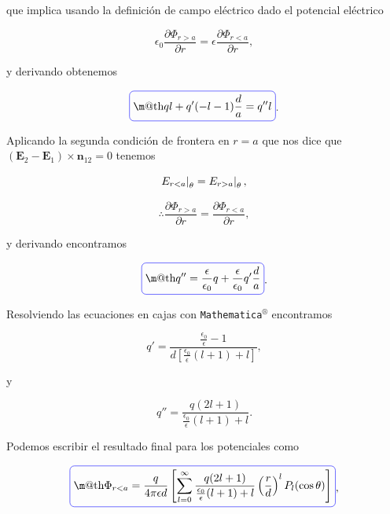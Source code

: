 \documentclass[a4paper,11pt]{article}
\makeatletter
\numberwithin{equation}{section}
\newcommand{\zerodel}{.\kern-\nulldelimiterspace}
\newcommand*{\boxcolor}{blue}
\renewcommand{\boxed}[1]{\textcolor{\boxcolor}{%
\tikz[baseline={([yshift=-1ex]current bounding box.center)}] \node [rectangle, minimum width=1ex,rounded corners,draw] {\normalcolor\m@th$\displaystyle#1$};}}
\makeatother
\begin{document}
que implica usando la definición de campo eléctrico dado el potencial eléctrico 

\begin{equation}
 \epsilon_0 \frac{\partial \Phi_{r > a}}{\partial r} = \epsilon 
 \frac{\partial \Phi_{r < a}}{\partial r},
\end{equation}

y derivando obtenemos 

\begin{equation}
 \boxed{ql + q'(-l -1)\frac{d}{a} = q'' l}.
\end{equation}

Aplicando la segunda condición de frontera en $r = a$ que nos dice que 
$(\mathbf{E}_2 - \mathbf{E}_1) \times \mathbf{n}_{12} = 0$ tenemos 

\begin{equation}
 \left\zerodel E_{r < a}\right|_\theta = \left\zerodel E_{r > a}\right|_\theta,
\end{equation}

\begin{equation}
 \therefore \frac{\partial \Phi_{r > a}}{\partial r} = 
 \frac{\partial \Phi_{r < a}}{\partial r},
\end{equation}

y derivando encontramos 

\begin{equation}
 \boxed{q'' = \frac{\epsilon}{\epsilon_0}q + \frac{\epsilon}{\epsilon_0}q'\frac{d}{a}}.
\end{equation}

Resolviendo las ecuaciones en cajas con \texttt{Mathematica$^\circledR$} encontramos 

\begin{equation}
 q' = \frac{\frac{\epsilon_0}{\epsilon} - 1}{d\left[\frac{\epsilon_0}{\epsilon}(l+1) + l\right]},
\end{equation}

y 

\begin{equation}
 q'' = \frac{q(2l + 1)}{\frac{\epsilon_0}{\epsilon}(l+1) +l}.
\end{equation}

Podemos escribir el resultado final para los potenciales como 

\begin{equation}
 \boxed{\Phi_{r < a} = \frac{q}{4\pi\epsilon d}\left[\sum_{l=0}^\infty 
 \frac{q(2l + 1)}{\frac{\epsilon_0}{\epsilon}(l+1) +l} \left(\frac{r}{d}\right)^l
 P_l(\cos{\theta})\right]},
\end{equation}
\end{document}
